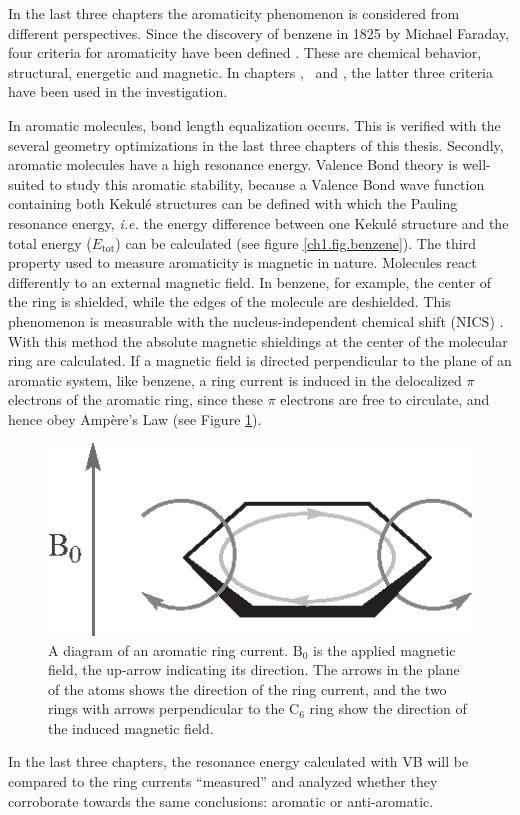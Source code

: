 In the last three chapters the aromaticity phenomenon is considered from different perspectives. Since the discovery of benzene in 1825 by Michael Faraday, four criteria for aromaticity have been defined \cite{aromaticity}. These are chemical behavior, structural, energetic and magnetic. In chapters \chhuckel, \chinorganic\ and \chindacene, the latter three criteria have been used in the investigation. 

In aromatic molecules, bond length equalization occurs. This is verified with the several geometry optimizations in the last three chapters of this thesis. Secondly, aromatic molecules have a high resonance energy. Valence Bond theory is well-suited to study this aromatic stability, because a Valence Bond wave function containing both Kekul\'{e} structures can be defined with which the Pauling resonance energy, \textit{i.e.} the energy difference between one Kekul\'e structure and the total energy ($E_\mathrm{tot}$) can be calculated \cite{pauling5} (see figure \ref{ch1.fig.benzene}). The third property used to measure aromaticity is magnetic in nature. Molecules react differently to an external magnetic field. In benzene, for example, the center of the ring is shielded, while the edges of the molecule are deshielded. This phenomenon is measurable with the nucleus-independent chemical shift (NICS) \cite{schleyer}. With this method the absolute magnetic shieldings at the center of the molecular ring are calculated. If a magnetic field is directed perpendicular to the plane of an aromatic system, like benzene, a ring current is induced in the delocalized $\pi$ electrons of the aromatic ring, since these $\pi$ electrons are free to circulate, and hence obey Amp\`{e}re's Law (see Figure \ref{ch1.fig.ringcurrent}).
\begin{figure}[htdp]
\center
\includegraphics{introduction/figures/ringcurrent.eps}
\caption{A diagram of an aromatic ring current. $\mathrm{B_0}$ is the applied magnetic field, the up-arrow indicating its direction. The arrows in the plane of the atoms shows the direction of the ring current, and the two rings with arrows perpendicular to the C$_6$ ring show the direction of the induced magnetic field.}
\label{ch1.fig.ringcurrent}
\end{figure}
In the last three chapters, the resonance energy calculated with VB will be compared to the ring currents ``measured'' and analyzed whether they corroborate towards the same conclusions: aromatic or anti-aromatic.


